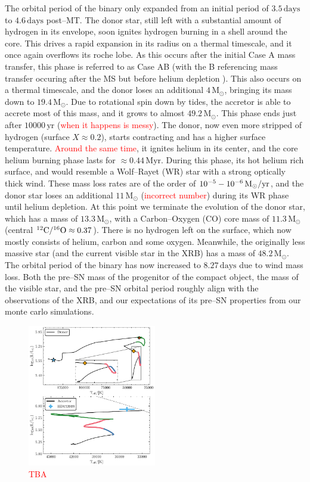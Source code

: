 \documentclass[linenumbers,trackchanges,twocolumn]{aastex701}
\newcommand{\Mdot}{\mathrm{M}_{\odot}}
\newcommand{\red}{\textcolor{red}}
\begin{document}
The orbital period of the binary only expanded from an initial period of $3.5\,\mathrm{days}$ to $4.6\,\mathrm{days}$ post--MT. The donor star, still left with a substantial amount of hydrogen in its envelope, soon ignites hydrogen burning in a shell around the core. This drives a rapid expansion in its radius on a thermal timescale, and it once again overflows its roche lobe. As this occurs after the initial Case A mass transfer, this phase is referred to as Case AB (with the B referencing mass transfer occuring after the MS but before helium depletion \cite{1967ZA.....65..251K}). This also occurs on a thermal timescale, and the donor loses an additional $4\,\Mdot$, bringing its mass down to $19.4\,\Mdot$. Due to rotational spin down by tides, the accretor is able to accrete most of this mass, and it grows to almost $49.2\,\Mdot$. This phase ends just after $10000\, \mathrm{yr}$ (\red{when it happens is messy}).  The donor, now even more stripped of hydrogen (surface $X \approx 0.2$), starts contracting and has a higher surface temperature. \red{Around the same time}, it ignites helium in its center, and the core helium burning phase lasts for $\approx 0.44\,\mathrm{Myr}$. During this phase, its hot helium rich surface, and would resemble a Wolf--Rayet (WR) star with a strong optically thick wind. These mass loss rates are of the order of $10^{-5} - 10^{-6} \,\Mdot/\rm yr$, and the donor star loses an additional $11\,\Mdot$ (\red{incorrect number}) during its WR phase until helium depletion. At this point we terminate the evolution of the donor star, which has a mass of $13.3\,\Mdot$, with a Carbon--Oxygen (CO) core mass of $11.3\,\Mdot$ (central $\rm ^{12}C/^{16}O \approx 0.37$). There is no hydrogen left on the surface, which now mostly consists of helium, carbon and some oxygen. Meanwhile, the originally less massive star (and the current visible star in the XRB) has a mass of $48.2\,\Mdot$. The orbital period of the binary has now increased to $8.27\,\mathrm{days}$ due to wind mass loss. Both the pre--SN mass of the progenitor of the compact object, the mass of the visible star, and the pre--SN orbital period roughly align with the observations of the XRB, and our expectations of its pre--SN properties from our monte carlo simulations.

\begin{figure}[htbp]
    \centering
    \includegraphics[width=0.5\textwidth]{xrb_fiducial_hr.pdf}
    \caption{\red{TBA}}
    \label{fig:xrb_fiducial_hr}
\end{figure}
\end{document}
